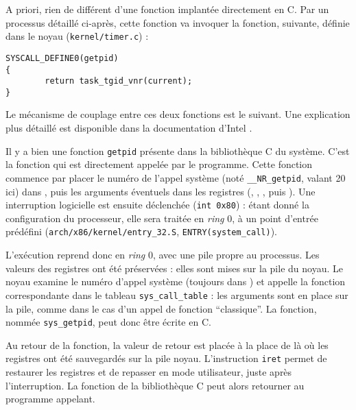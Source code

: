A priori, rien de différent d'une fonction implantée directement en C. Par un
processus détaillé ci-après, cette fonction va invoquer la fonction, suivante,
définie dans le noyau (\texttt{kernel/timer.c}) :

\begin{Verbatim}
SYSCALL_DEFINE0(getpid)
{
        return task_tgid_vnr(current);
}
\end{Verbatim}



Le mécanisme de couplage entre ces deux fonctions est le suivant. Une
explication plus détaillé est disponible dans la documentation d'Intel
\cite{intelsys}.

Il y a bien une fonction \texttt{getpid} présente dans la bibliothèque C du
système. C'est la fonction qui est directement appelée par le programme. Cette
fonction commence par placer le numéro de l'appel système (noté
\texttt{\_\_NR\_getpid}, valant 20 ici) dans \eax, puis les arguments éventuels
dans les registres (\ebx, \ecx, \edx, \esi puis \edi). Une interruption
logicielle est ensuite déclenchée (\texttt{int 0x80}) : étant donné la
configuration du processeur, elle sera traitée en \emph{ring} 0, à un point
d'entrée prédéfini (\texttt{arch/x86/kernel/entry\_32.S},
\texttt{ENTRY(system\_call)}).

L'exécution reprend donc en \emph{ring} 0, avec une pile propre au processus.
Les valeurs des registres ont été préservées : elles sont mises sur la pile du
noyau. Le noyau examine le numéro d'appel système (toujours dans \eax) et
appelle la fonction correspondante dans le tableau \texttt{sys\_call\_table} : les arguments sont en place sur la pile, comme dans le
cas d'un appel de fonction ``classique''. La fonction, nommée
\texttt{sys\_getpid}, peut donc être écrite en C.

Au retour de la fonction, la valeur de retour est placée à la place de \eax là
où les registres ont été sauvegardés sur la pile noyau. L'instruction
\texttt{iret} permet de restaurer les registres et de repasser en mode
utilisateur, juste après l'interruption. La fonction de la bibliothèque C peut
alors retourner au programme appelant.
